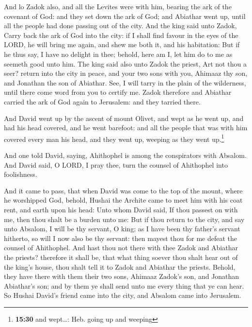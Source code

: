  And lo Zadok also, and all the Levites were with him,
bearing the ark of the covenant of God: and they set down the ark of
God; and Abiathar went up, until all the people had done passing out of
the city.  And the king said unto Zadok, Carry back the
ark of God into the city: if I shall find favour in the eyes of the
LORD, he will bring me again, and shew me both it, and his habitation:
 But if he thus say, I have no delight in thee; behold,
here am I, let him do to me as seemeth good unto him. 
The king said also unto Zadok the priest, Art not thou a seer? return
into the city in peace, and your two sons with you, Ahimaaz thy son, and
Jonathan the son of Abiathar.  See, I will tarry in the
plain of the wilderness, until there come word from you to certify me.
 Zadok therefore and Abiathar carried the ark of God
again to Jerusalem: and they tarried there.

 And David went up by the ascent of mount Olivet, and
wept as he went up, and had his head covered, and he went barefoot: and
all the people that was with him covered every man his head, and they
went up, weeping as they went up.\footnote{\textbf{15:30} and
  wept\ldots: Heb. going up and weeping}

 And one told David, saying, Ahithophel is among the
conspirators with Absalom. And David said, O LORD, I pray thee, turn the
counsel of Ahithophel into foolishness.

 And it came to pass, that when David was come to the top
of the mount, where he worshipped God, behold, Hushai the Archite came
to meet him with his coat rent, and earth upon his head: 
Unto whom David said, If thou passest on with me, then thou shalt be a
burden unto me:  But if thou return to the city, and say
unto Absalom, I will be thy servant, O king; as I have been thy father's
servant hitherto, so will I now also be thy servant: then mayest thou
for me defeat the counsel of Ahithophel.  And hast thou
not there with thee Zadok and Abiathar the priests? therefore it shall
be, that what thing soever thou shalt hear out of the king's house, thou
shalt tell it to Zadok and Abiathar the priests.  Behold,
they have there with them their two sons, Ahimaaz Zadok's son, and
Jonathan Abiathar's son; and by them ye shall send unto me every thing
that ye can hear.  So Hushai David's friend came into the
city, and Absalom came into Jerusalem.

